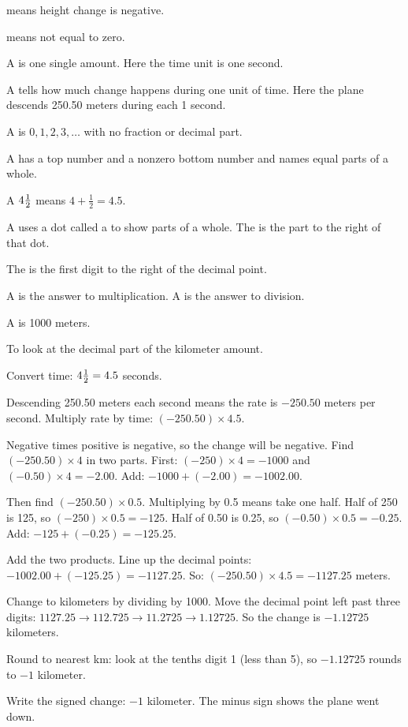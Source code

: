 \begin{words}
  \item {}means height change is negative.
  \item {}means not equal to zero.
  \item A is one single amount. Here the time unit is one second.
  \item A tells how much change happens during one unit of time. Here the plane descends 250.50 meters during each 1 second.
  \item A is $0, 1, 2, 3, \ldots$ with no fraction or decimal part.
  \item A has a top number and a nonzero bottom number and names equal parts of a whole.
  \item A $4\tfrac{1}{2}$ means $4 + \frac{1}{2} = 4.5$.
  \item A uses a dot called a to show parts of a whole. The is the part to the right of that dot.
  \item The is the first digit to the right of the decimal point.
  \item A is the answer to multiplication. A is the answer to division.
  \item A is 1000 meters.
  \item To look at the decimal part of the kilometer amount.
\end{words}

\begin{steps}
  \item Convert time: $4\tfrac{1}{2} = 4.5$ seconds.
  \item Descending 250.50 meters each second means the rate is $-250.50$ meters per second. Multiply rate by time: $(-250.50) \times 4.5$.
  \item Negative times positive is negative, so the change will be negative. Find $(-250.50) \times 4$ in two parts. First: $(-250) \times 4 = -1000$ and $(-0.50) \times 4 = -2.00$. Add: $-1000 + (-2.00) = -1002.00$.
  \item Then find $(-250.50) \times 0.5$. Multiplying by 0.5 means take one half. Half of 250 is 125, so $(-250) \times 0.5 = -125$. Half of 0.50 is 0.25, so $(-0.50) \times 0.5 = -0.25$. Add: $-125 + (-0.25) = -125.25$.
  \item Add the two products. Line up the decimal points: $-1002.00 + (-125.25) = -1127.25$. So: $(-250.50) \times 4.5 = -1127.25$ meters.
  \item Change to kilometers by dividing by 1000. Move the decimal point left past three digits: $1127.25 \to 112.725 \to 11.2725 \to 1.12725$. So the change is $-1.12725$ kilometers.
  \item Round to nearest km: look at the tenths digit 1 (less than 5), so $-1.12725$ rounds to $-1$ kilometer.
  \item Write the signed change: $-1$ kilometer. The minus sign shows the plane went down.
\end{steps}

